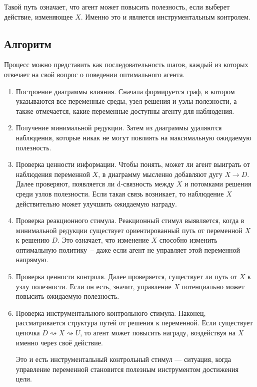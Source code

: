 Такой путь означает, что агент может повысить полезность,  
если выберет действие, изменяющее $X$.  
Именно это и является инструментальным контролем.


\subsection{Алгоритм}

Процесс можно представить как последовательность шагов, каждый из которых 
отвечает на свой вопрос о поведении оптимального агента.

\begin{enumerate}
    \item Построение диаграммы влияния. 
    Сначала формируется граф, в котором указываются все переменные среды, 
    узел решения и узлы полезности, а также отмечается, какие переменные 
    доступны агенту для наблюдения.
    
    \item Получение минимальной редукции.  
    Затем из диаграммы удаляются наблюдения, которые никак не могут повлиять 
    на максимальную ожидаемую полезность.

    \item Проверка ценности информации. 
    Чтобы понять, может ли агент выиграть от наблюдения переменной $X$, 
    в диаграмму мысленно добавляют дугу $X \to D$. Далее проверяют, 
    появляется ли d-связность между $X$ и потомками решения среди узлов 
    полезности. Если такая связь возникает, то наблюдение $X$ действительно 
    может улучшить ожидаемую награду.
    
    \item Проверка реакционного стимула. 
    Реакционный стимул выявляется, когда в минимальной редукции существует 
    ориентированный путь от переменной $X$ к решению $D$. Это означает, 
    что изменение $X$ способно изменить оптимальную политику~-- даже если агент 
    не управляет этой переменной напрямую.
    
    \item Проверка ценности контроля. 
    Далее проверяется, существует ли путь от $X$ к узлу полезности. Если он есть, 
    значит, управление $X$ потенциально может повысить ожидаемую полезность. 
    
    \item Проверка инструментального контрольного стимула.  
    Наконец, рассматривается структура путей от решения к переменной. Если 
    существует цепочка $D \rightsquigarrow X \rightsquigarrow U$, то агент 
    может повысить награду, воздействуя на $X$ именно через своё действие. 
    
    Это и есть инструментальный контрольный стимул — ситуация, когда управление 
    переменной становится полезным инструментом достижения цели.
\end{enumerate}

